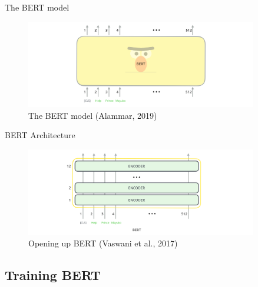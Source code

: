 \documentclass[10pt]{beamer}
\begin{document}
\begin{frame}{The BERT model}

\begin{figure}[h]
\centering
\includegraphics[width=0.9\textwidth]{fig/bert-input-output.png}
\caption{The BERT model (Alammar, 2019)}
\end{figure}

\end{frame}


\begin{frame}{BERT Architecture}

\begin{figure}[h]
\centering
\includegraphics[width=0.9\textwidth]{fig/bert-encoders-input.png}
\caption{Opening up BERT (Vaswani et al., 2017)}
\end{figure}

\end{frame}



\subsection{Training BERT}
\end{document}

